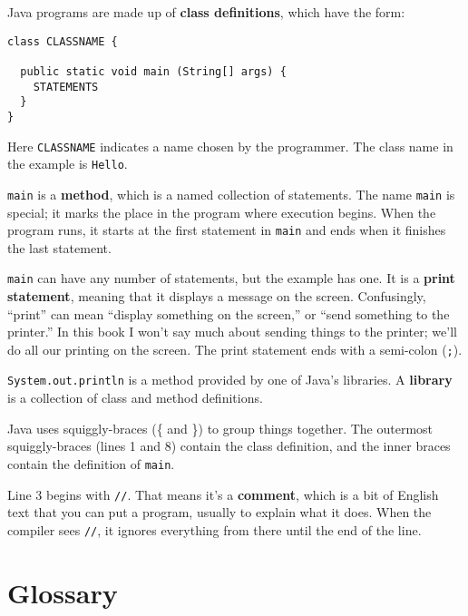 \documentclass[12pt]{book}
\theoremstyle{definition}
\begin{document}
Java programs are made up of {\bf class definitions}, which have
the form:


\begin{lstlisting}
class CLASSNAME {

  public static void main (String[] args) {
    STATEMENTS
  }
}
\end{lstlisting}
%
Here {\tt CLASSNAME} indicates a name chosen by the programmer.
The class name in the example is {\tt Hello}.


{\tt main} is a {\bf method}, which is a named collection of
statements.  The name {\tt main} is special; it marks the place in the
program where execution begins.  When the program runs, it starts at
the first statement in {\tt main} and ends when it finishes the last
statement.


{\tt main} can have any number of statements, but the example has one.
It is a {\bf print statement}, meaning that it displays a message on
the screen.  Confusingly, ``print'' can mean ``display something on
the screen,'' or ``send something to the printer.''  In this book I
won't say much about sending things to the printer; we'll do all our
printing on the screen.  The print statement ends with a semi-colon
({\tt ;}).

{\tt System.out.println} is a method provided by one of Java's
libraries.  A {\bf library} is a collection of class and method
definitions.

Java uses squiggly-braces (\{ and \}) to group things together.  The
outermost squiggly-braces (lines 1 and 8) contain the class
definition, and the inner braces contain the definition of {\tt main}.


Line 3 begins with {\tt //}.  That means it's 
a {\bf comment}, which is a bit of
English text that you can put a program,
usually to explain what it does.  When the compiler
sees {\tt //}, it ignores everything from there until the end
of the line.


\section{Glossary}
\end{document}
